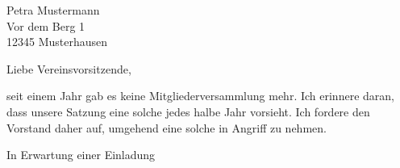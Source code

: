 \documentclass[version=last]{scrlttr2}
\begin{document}
\begin{letter}{%
    Petra Mustermann\\
    Vor dem Berg 1\\
    12345 Musterhausen%
  }
\opening{Liebe Vereinsvorsitzende,}
seit einem Jahr gab es keine Mitgliederversammlung
mehr. Ich erinnere daran, dass unsere Satzung eine
solche jedes halbe Jahr vorsieht. Ich fordere den
Vorstand daher auf, umgehend eine solche in
Angriff zu nehmen.
\closing{In Erwartung einer Einladung}
\end{letter}
\end{document}
